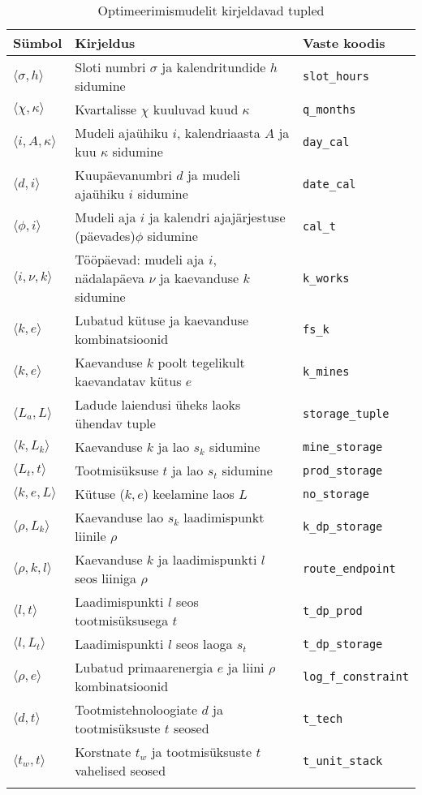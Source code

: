 \begin{table}
\begin{tabular}{l l l}
Sümbol & Kirjeldus & Vaste koodis\\
\hline
$\langle \sigma, h \rangle$ & Sloti numbri $\sigma$ ja kalendritundide $h$ sidumine & \texttt{slot\_hours} \\
$\langle \chi, \kappa \rangle$ & Kvartalisse $\chi$ kuuluvad kuud $\kappa$ & \texttt{q\_months} \\
$\langle i, A, \kappa \rangle$& Mudeli ajaühiku $i$, kalendriaasta $A$ ja kuu $\kappa$ sidumine& \texttt{day\_cal} \\
$\langle d, i \rangle$& Kuupäevanumbri $d$ ja mudeli ajaühiku $i$ sidumine & \texttt{date\_cal} \\
$\langle \phi, i \rangle$& Mudeli aja $i$ ja kalendri ajajärjestuse (päevades)$\phi$ sidumine & \texttt{cal\_t} \\
$\langle i, \nu, k \rangle$& Tööpäevad: mudeli aja $i$, nädalapäeva $\nu$ ja kaevanduse $k$ sidumine & \texttt{k\_works} \\

$\langle k, e \rangle$      & Lubatud kütuse ja kaevanduse kombinatsioonid & \texttt{fs\_k} \\ 
$\langle k, e \rangle$      & Kaevanduse $k$ poolt tegelikult kaevandatav kütus $e$ & \texttt{k\_mines} \\ 

$\langle L_a, L \rangle$    & Ladude laiendusi üheks laoks ühendav tuple & \texttt{storage\_tuple}\\
$\langle k, L_k \rangle$    & Kaevanduse $k$ ja lao $s_k$ sidumine  & \texttt{mine\_storage}\\
$\langle L_t, t \rangle$    & Tootmisüksuse $t$ ja lao $s_t$ sidumine  & \texttt{prod\_storage}\\
$\langle k, e, L \rangle$   & Kütuse ($k,e$) keelamine laos $L$  & \texttt{no\_storage}\\
$\langle \rho, L_k \rangle$ & Kaevanduse lao $s_k$ laadimispunkt liinile $\rho$  & \texttt{k\_dp\_storage}\\
$\langle \rho, k, l \rangle$& Kaevanduse $k$ ja laadimispunkti $l$ seos liiniga $\rho$  & \texttt{route\_endpoint}\\
$\langle l, t \rangle$      & Laadimispunkti $l$ seos tootmisüksusega $t$& \texttt{t\_dp\_prod}\\                       
$\langle l, L_t \rangle$    & Laadimispunkti $l$ seos laoga $s_t$ & \texttt{t\_dp\_storage}\\
$\langle \rho, e \rangle$   & Lubatud primaarenergia $e$ ja liini $\rho$ kombinatsioonid & \texttt{log\_f\_constraint}\\

$\langle d, t \rangle$      & Tootmistehnoloogiate $d$ ja tootmisüksuste $t$ seosed & \texttt{t\_tech}\\
$\langle t_w, t \rangle$    & Korstnate $t_w$ ja tootmisüksuste $t$ vahelised seosed & \texttt{t\_unit\_stack}\\
&&
\end{tabular}
\caption{Optimeerimismudelit kirjeldavad tupled \label{tab:tupled}}
\end{table}
